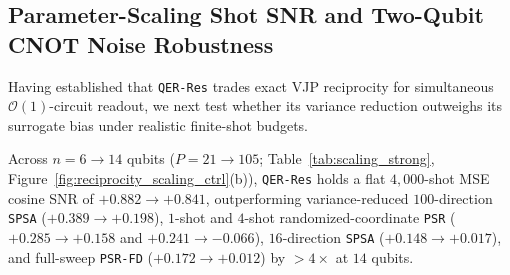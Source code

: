 \documentclass[11pt]{article}
\begin{document}
\subsection{Parameter-Scaling Shot SNR and Two-Qubit CNOT Noise Robustness}
\label{sec:new_controls}
Having established that \texttt{QER-Res} trades exact VJP reciprocity for simultaneous $\mathcal{O}(1)$-circuit readout, we next test whether its variance reduction outweighs its surrogate bias under realistic finite-shot budgets.

\begin{table}[t!]
\centering
\caption{\textbf{$4{,}000$-Shot MSE Cosine SNR Scaling vs.\ Multi-Direction SPSA and $1$-/$4$-Shot Coordinate PSR ($3$ Seeds, $L{=}2$, All-to-All Ising Circuit).} Cosine similarity between each finite-shot estimator ($4{,}000$ total shots) and the exact noiseless MSE gradient $-\nabla_\theta\mathcal{L}_{\text{MSE}}$.}
\label{tab:scaling_strong}
\small
{}
\end{table}

Across $n{=}6{\to}14$ qubits ($P{=}21{\to}105$; Table~\ref{tab:scaling_strong}, Figure~\ref{fig:reciprocity_scaling_ctrl}(b)), \texttt{QER-Res} holds a flat $4{,}000$-shot MSE cosine SNR of \textbf{$+0.882\to +0.841$}, outperforming variance-reduced $100$-direction \texttt{SPSA} ($+0.389\to +0.198$), $1$-shot and $4$-shot randomized-coordinate \texttt{PSR} ($+0.285\to +0.158$ and $+0.241\to -0.066$), $16$-direction \texttt{SPSA} ($+0.148\to +0.017$), and full-sweep \texttt{PSR-FD} ($+0.172\to +0.012$) by $>4\times$ at $14$ qubits.
\end{document}
